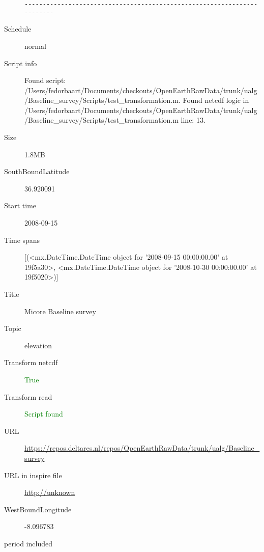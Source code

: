 \documentclass[9]{report}
\begin{document}
\begin{description}
\begin{verbatim}
------------------------------------------------------------------------

\end{verbatim}
  \item[Schedule] normal
  \item[Script info] Found script: /Users/fedorbaart/Documents/checkouts/OpenEarthRawData/trunk/ualg/Baseline\_survey/Scripts/test\_transformation.m.
Found netcdf logic in /Users/fedorbaart/Documents/checkouts/OpenEarthRawData/trunk/ualg/Baseline\_survey/Scripts/test\_transformation.m line: 13.
  \item[Size] 1.8MB
  \item[SouthBoundLatitude] 36.920091
  \item[Start time] 2008-09-15
  \item[Time spans] [(<mx.DateTime.DateTime object for '2008-09-15 00:00:00.00' at 19f5a30>, <mx.DateTime.DateTime object for '2008-10-30 00:00:00.00' at 19f5020>)]
  \item[Title]  Micore Baseline survey 
  \item[Topic] elevation
  \item[Transform netcdf] \textcolor{green}{True}
  \item[Transform read] \textcolor{green}{Script found}
  \item[URL] \href{https://repos.deltares.nl/repos/OpenEarthRawData/trunk/ualg/Baseline\_survey}{https://repos.deltares.nl/repos/OpenEarthRawData/trunk/ualg/Baseline\_survey}
  \item[URL in inspire file] \href{http://unknown}{http://unknown}
  \item[WestBoundLongitude] -8.096783
  \item[period included] 
\end{description}
\end{document}
